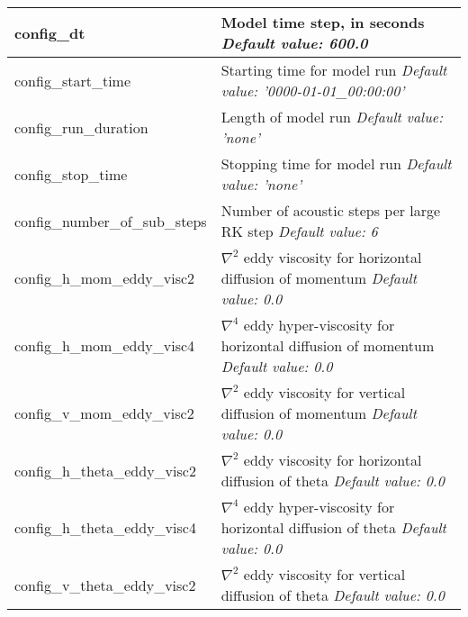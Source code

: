 {\small
\begin{longtable}{|p{1.75in} |p{4.5in}|}
 \hline   
   config\_dt & Model time step, in seconds \newline 
   {\em Default value: 600.0} \\ \hline

   config\_start\_time & Starting time for model run \newline 
   {\em Default value: '0000-01-01\_00:00:00'} \\ \hline

   config\_run\_duration & Length of model run \newline 
   {\em Default value: 'none'} \\ \hline

   config\_stop\_time  & Stopping time for model run \newline 
   {\em Default value: 'none'} \\ \hline

   config\_number\_of\_sub\_steps & Number of acoustic steps per large RK step \newline 
   {\em Default value: 6} \\ \hline

   config\_h\_mom\_eddy\_visc2 & $\nabla^2$ eddy viscosity for horizontal diffusion of momentum \newline 
   {\em Default value: 0.0} \\ \hline

   config\_h\_mom\_eddy\_visc4 & $\nabla^4$ eddy hyper-viscosity for horizontal diffusion of momentum \newline 
   {\em Default value: 0.0} \\ \hline

   config\_v\_mom\_eddy\_visc2 & $\nabla^2$ eddy viscosity for vertical diffusion of momentum \newline 
   {\em Default value: 0.0} \\ \hline

   config\_h\_theta\_eddy\_visc2 & $\nabla^2$ eddy viscosity for horizontal diffusion of theta \newline 
   {\em Default value: 0.0} \\ \hline

   config\_h\_theta\_eddy\_visc4 & $\nabla^4$ eddy hyper-viscosity for horizontal diffusion of theta \newline 
   {\em Default value: 0.0} \\ \hline

   config\_v\_theta\_eddy\_visc2 & $\nabla^2$ eddy viscosity for vertical diffusion of theta \newline 
   {\em Default value: 0.0} \\ \hline


\end{longtable}}
